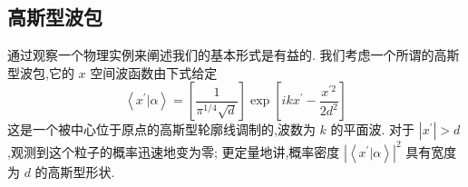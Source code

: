 \documentclass[lang=cn,newtx,10pt,scheme=chinese,thmcnt=section]{elegantbook}
\begin{document}
\subsection*{高斯型波包}
通过观察一个物理实例来阐述我们的基本形式是有益的. 我们考虑一个所谓的高斯型波包,它的 $x$ 空间波函数由下式给定
\begin{equation}
	\left\langle {{x}^{\prime } | \alpha }\right\rangle = \left\lbrack \frac{1}{{\pi }^{1/4}\sqrt{d}}\right\rbrack \exp \left\lbrack {{ik}{x}^{\prime } - \frac{{x}^{\prime 2}}{2{d}^{2}}}\right\rbrack
\end{equation}
这是一个被中心位于原点的高斯型轮廓线调制的,波数为 $k$ 的平面波. 对于 $\left| {x}^{\prime }\right| > d$ ,观测到这个粒子的概率迅速地变为零; 更定量地讲,概率密度 ${\left| \left\langle {x}^{\prime } | \alpha \right\rangle \right| }^{2}$ 具有宽度为 $d$ 的高斯型形状.
\end{document}
